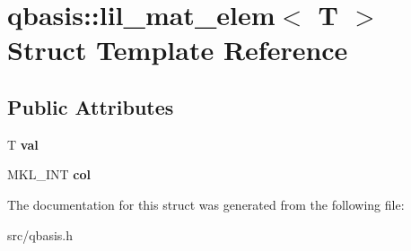 \hypertarget{structqbasis_1_1lil__mat__elem}{}\section{qbasis\+:\+:lil\+\_\+mat\+\_\+elem$<$ T $>$ Struct Template Reference}
\label{structqbasis_1_1lil__mat__elem}
\subsection*{Public Attributes}
\begin{DoxyCompactItemize}
\item 
\mbox{\label{structqbasis_1_1lil__mat__elem_a1a1d9dcf23990f747e084c530a1b4189}} 
T {\bfseries val}
\item 
\mbox{\label{structqbasis_1_1lil__mat__elem_a922bec54c8758e717d0dca0876453adb}} 
M\+K\+L\+\_\+\+I\+NT {\bfseries col}
\end{DoxyCompactItemize}


The documentation for this struct was generated from the following file\+:\begin{DoxyCompactItemize}
\item 
src/qbasis.\+h\end{DoxyCompactItemize}
